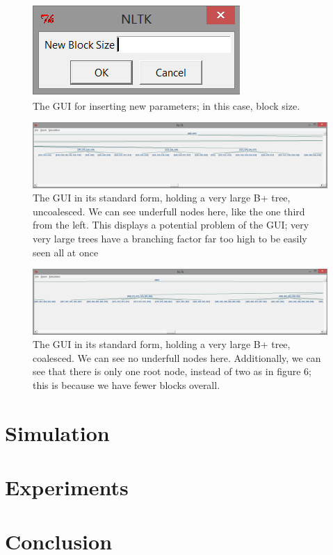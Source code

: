 \documentclass[fleqn]{article}
\begin{document}
\begin{figure}[h]
\centerline{\includegraphics{Images/gui5.png}}
\caption{The GUI for inserting new parameters; in this case, block size.}
\end{figure}

\begin{figure}[h]
\centerline{\includegraphics[width=1.2\linewidth]{Images/gui7.png}}
\caption{The GUI in its standard form, holding a very large B+ tree, uncoalesced.  We can see underfull nodes here, like the one third from the left.  This displays a potential problem of the GUI; very very large trees have a branching factor far too high to be easily seen all at once}
\end{figure}

\begin{figure}[h]
\centerline{\includegraphics[width=1.2\linewidth]{Images/gui8.png}}
\caption{The GUI in its standard form, holding a very large B+ tree, coalesced.  We can see no underfull nodes here.  Additionally, we can see that there is only one root node, instead of two as in figure 6; this is because we have fewer blocks overall.}
\end{figure}

\section{Simulation}


\section{Experiments}

\section{Conclusion}
\end{document}

